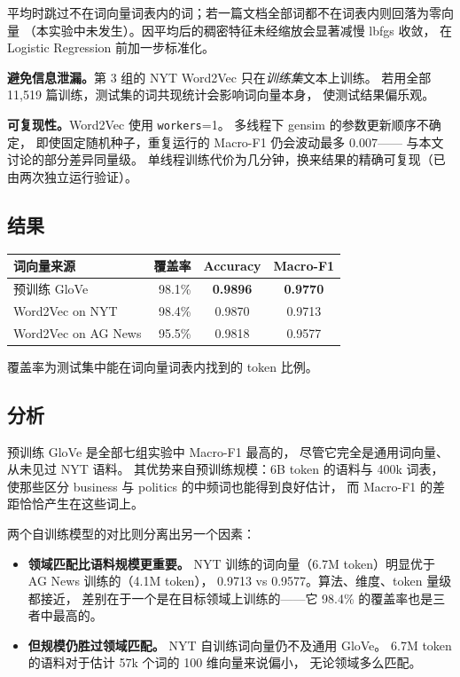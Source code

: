 \documentclass[10pt,twocolumn,letterpaper]{article}
\begin{document}
平均时跳过不在词向量词表内的词；若一篇文档全部词都不在词表内则回落为零向量
（本实验中未发生）。因平均后的稠密特征未经缩放会显著减慢 lbfgs 收敛，
在 Logistic Regression 前加一步标准化。

\textbf{避免信息泄漏。}第 3 组的 NYT Word2Vec 只在\emph{训练集}文本上训练。
若用全部 11{,}519 篇训练，测试集的词共现统计会影响词向量本身，
使测试结果偏乐观。

\textbf{可复现性。}Word2Vec 使用 \texttt{workers}=1。
多线程下 gensim 的参数更新顺序不确定，
即使固定随机种子，重复运行的 Macro-F1 仍会波动最多 0.007——
与本文讨论的部分差异同量级。
单线程训练代价为几分钟，换来结果的精确可复现（已由两次独立运行验证）。

\subsection{结果}

\begin{center}\small
\begin{tabular}{lrcc}
\toprule
词向量来源 & 覆盖率 & Accuracy & Macro-F1 \\
\midrule
预训练 GloVe        & 98.1\% & \textbf{0.9896} & \textbf{0.9770} \\
Word2Vec on NYT     & 98.4\% & 0.9870 & 0.9713 \\
Word2Vec on AG News & 95.5\% & 0.9818 & 0.9577 \\
\bottomrule
\end{tabular}
\end{center}

覆盖率为测试集中能在词向量词表内找到的 token 比例。

\subsection{分析}

预训练 GloVe 是全部七组实验中 Macro-F1 最高的，
尽管它完全是通用词向量、从未见过 NYT 语料。
其优势来自预训练规模：6B token 的语料与 400k 词表，
使那些区分 business 与 politics 的中频词也能得到良好估计，
而 Macro-F1 的差距恰恰产生在这些词上。

两个自训练模型的对比则分离出另一个因素：

\begin{itemize}\itemsep2pt
\item \textbf{领域匹配比语料规模更重要。}
NYT 训练的词向量（6.7M token）明显优于 AG News 训练的（4.1M token），
0.9713 vs 0.9577。算法、维度、token 量级都接近，
差别在于一个是在目标领域上训练的——它 98.4\% 的覆盖率也是三者中最高的。
\item \textbf{但规模仍胜过领域匹配。}
NYT 自训练词向量仍不及通用 GloVe。
6.7M token 的语料对于估计 57k 个词的 100 维向量来说偏小，
无论领域多么匹配。
\end{itemize}
\end{document}
